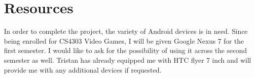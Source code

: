 \documentclass[a4page]{article}
\begin{document}
\section{Resources}
In order to complete the project, the variety of Android devices is in need. Since being enrolled for CS4303 Video Games, I will be given Google Nexus 7 for the first semester. I would like to ask for the possibility of using it across the second semester as well. Tristan has already equipped me with HTC flyer 7 inch and will provide me with any additional devices if requested.


\end{document}
